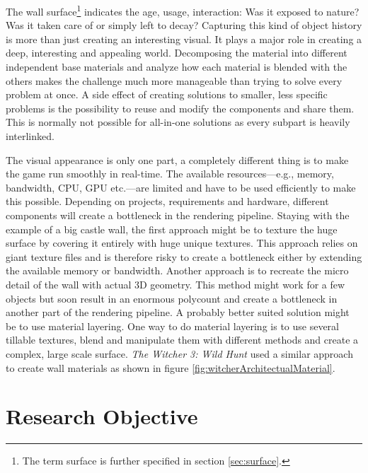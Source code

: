 The wall surface\footnote{The term surface is further specified in section \ref{sec:surface}.} indicates the age, usage, interaction: Was it exposed to nature? Was it taken care of or simply left to decay? Capturing this kind of object history is more than just creating an interesting visual. It plays a major role in creating a deep, interesting and appealing world. Decomposing the material into different independent base materials and analyze how each material is blended with the others makes the challenge much more manageable than trying to solve every problem at once. A side effect of creating solutions to smaller, less specific problems is the possibility to reuse and modify the components and share them. This is normally not possible for all-in-one solutions as every subpart is heavily interlinked. 

The visual appearance is only one part, a completely different thing is to make the game run smoothly in real-time. The available resources---e.g., memory, bandwidth, CPU, GPU etc.---are limited and have to be used efficiently to make this possible. Depending on projects, requirements and hardware, different components will create a bottleneck in the rendering pipeline. Staying with the example of a big castle wall, the first approach might be to texture the huge surface by covering it entirely with huge unique textures. This approach relies on giant texture files and is therefore risky to create a bottleneck either by extending the available memory or bandwidth. Another approach is to recreate the micro detail of the wall with actual 3D geometry. This method might work for a few objects but soon result in an enormous polycount and create a bottleneck in another part of the rendering pipeline. A probably better suited solution might be to use material layering. One way to do material layering is to use several tillable textures, blend and manipulate them with different methods and create a complex, large scale surface. \emph{The Witcher 3: Wild Hunt} \cite{witcher2015cdproject} used a similar approach to create wall materials as shown in figure \ref{fig:witcherArchitectualMaterial}. 

\section{Research Objective}

